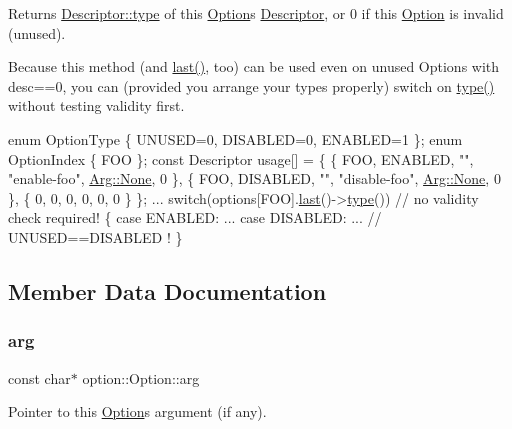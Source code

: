 Returns \hyperlink{structoption_1_1Descriptor_a1b220dabd8aad075fa441a80f9b9343c}{Descriptor\+::type} of this \hyperlink{classoption_1_1Option}{Option}\textquotesingle{}s \hyperlink{structoption_1_1Descriptor}{Descriptor}, or 0 if this \hyperlink{classoption_1_1Option}{Option} is invalid (unused). 

Because this method (and \hyperlink{classoption_1_1Option_afe2aff68191e55b59c53fac3dbbcd7c3}{last()}, too) can be used even on unused Options with desc==0, you can (provided you arrange your types properly) switch on \hyperlink{classoption_1_1Option_a5268a69e1a91137186ab772574296da0}{type()} without testing validity first. 
\begin{DoxyCode}
\textcolor{keyword}{enum} OptionType \{ UNUSED=0, DISABLED=0, ENABLED=1 \};
\textcolor{keyword}{enum} OptionIndex \{ FOO \};
\textcolor{keyword}{const} Descriptor usage[] = \{
  \{ FOO, ENABLED,  \textcolor{stringliteral}{""}, \textcolor{stringliteral}{"enable-foo"},  \hyperlink{structoption_1_1Arg_a7fc01987899c91c6b6a1be5711a46e22}{Arg::None}, 0 \},
  \{ FOO, DISABLED, \textcolor{stringliteral}{""}, \textcolor{stringliteral}{"disable-foo"}, \hyperlink{structoption_1_1Arg_a7fc01987899c91c6b6a1be5711a46e22}{Arg::None}, 0 \},
  \{ 0, 0, 0, 0, 0, 0 \} \};
...
switch(options[FOO].\hyperlink{classoption_1_1Option_afe2aff68191e55b59c53fac3dbbcd7c3}{last}()->\hyperlink{classoption_1_1Option_a5268a69e1a91137186ab772574296da0}{type}()) \textcolor{comment}{// no validity check required!}
\{
  \textcolor{keywordflow}{case} ENABLED: ...
  \textcolor{keywordflow}{case} DISABLED: ...  \textcolor{comment}{// UNUSED==DISABLED !}
\}
\end{DoxyCode}
 

\subsection{Member Data Documentation}
\mbox{\label{classoption_1_1Option_a402be734987458364b0f473acae36238}} 
\subsubsection{\texorpdfstring{arg}{arg}}
{\footnotesize\ttfamily const char$\ast$ option\+::\+Option\+::arg}



Pointer to this \hyperlink{classoption_1_1Option}{Option}\textquotesingle{}s argument (if any). 

